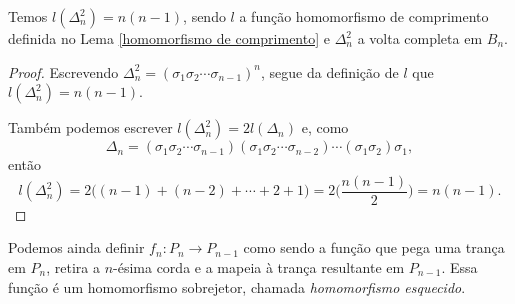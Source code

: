 	\begin{prop}
		Temos $l(\Delta_n^2) = n(n-1)$, sendo $l$ a função homomorfismo de comprimento definida 
		no Lema \ref{homomorfismo de comprimento} e $\Delta_n^2$ a volta completa em $B_n$.
	\end{prop}
	\begin{proof}
		Escrevendo $\Delta_n^2 = (\sigma_1\sigma_2\cdots\sigma_{n-1})^n$, segue da definição 
		de $l$ que $l(\Delta_n^2) = n(n-1)$. 
		
		\par\vspace{0.3cm} Também podemos escrever $l(\Delta_n^2) = 2l(\Delta_n)$ e, como
		\[
		\Delta_n 
		= (\sigma_1\sigma_2\cdots\sigma_{n-1})(\sigma_1\sigma_2\cdots\sigma_{n-2})
		\cdots(\sigma_1\sigma_2)\sigma_1,
		\]
		então
		\[
		l(\Delta_n^2) 
		= 2\Big( (n-1) + (n-2) + \cdots + 2 + 1 \Big) = 2\Big( \displaystyle{\frac{n(n-1)}{2}} \Big) = n(n-1).
		\]
	\end{proof}
	Podemos ainda definir $f_n: P_n\to P_{n-1}$ como sendo a função que 
	pega uma trança em $P_n$, retira a $n$-ésima 
	corda e a mapeia à trança resultante em $P_{n-1}$. Essa função é um homomorfismo sobrejetor, chamada
	\textit{homomorfismo esquecido}.
	
